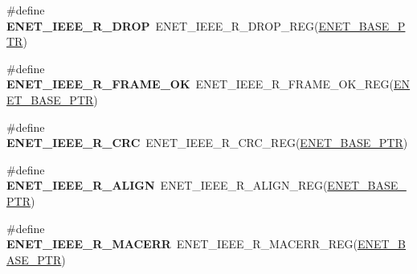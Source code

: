 \begin{DoxyCompactItemize}
\item 
\hypertarget{group___e_n_e_t___register___accessor___macros_gaccf89cd15d247486412191b1af3f77c3}{}\#define {\bfseries E\+N\+E\+T\+\_\+\+I\+E\+E\+E\+\_\+\+R\+\_\+\+D\+R\+O\+P}~E\+N\+E\+T\+\_\+\+I\+E\+E\+E\+\_\+\+R\+\_\+\+D\+R\+O\+P\+\_\+\+R\+E\+G(\hyperlink{group___e_n_e_t___peripheral_gab64a2d991cc2bd76dd55ee25a52dcb5c}{E\+N\+E\+T\+\_\+\+B\+A\+S\+E\+\_\+\+P\+T\+R})\label{group___e_n_e_t___register___accessor___macros_gaccf89cd15d247486412191b1af3f77c3}

\item 
\hypertarget{group___e_n_e_t___register___accessor___macros_ga8dec0614e17f4be2b36f2ed6c68695ef}{}\#define {\bfseries E\+N\+E\+T\+\_\+\+I\+E\+E\+E\+\_\+\+R\+\_\+\+F\+R\+A\+M\+E\+\_\+\+O\+K}~E\+N\+E\+T\+\_\+\+I\+E\+E\+E\+\_\+\+R\+\_\+\+F\+R\+A\+M\+E\+\_\+\+O\+K\+\_\+\+R\+E\+G(\hyperlink{group___e_n_e_t___peripheral_gab64a2d991cc2bd76dd55ee25a52dcb5c}{E\+N\+E\+T\+\_\+\+B\+A\+S\+E\+\_\+\+P\+T\+R})\label{group___e_n_e_t___register___accessor___macros_ga8dec0614e17f4be2b36f2ed6c68695ef}

\item 
\hypertarget{group___e_n_e_t___register___accessor___macros_ga517e6963ed94b067d5820f77694f9fb5}{}\#define {\bfseries E\+N\+E\+T\+\_\+\+I\+E\+E\+E\+\_\+\+R\+\_\+\+C\+R\+C}~E\+N\+E\+T\+\_\+\+I\+E\+E\+E\+\_\+\+R\+\_\+\+C\+R\+C\+\_\+\+R\+E\+G(\hyperlink{group___e_n_e_t___peripheral_gab64a2d991cc2bd76dd55ee25a52dcb5c}{E\+N\+E\+T\+\_\+\+B\+A\+S\+E\+\_\+\+P\+T\+R})\label{group___e_n_e_t___register___accessor___macros_ga517e6963ed94b067d5820f77694f9fb5}

\item 
\hypertarget{group___e_n_e_t___register___accessor___macros_ga3deebba7193f28275cb1598150dc3c91}{}\#define {\bfseries E\+N\+E\+T\+\_\+\+I\+E\+E\+E\+\_\+\+R\+\_\+\+A\+L\+I\+G\+N}~E\+N\+E\+T\+\_\+\+I\+E\+E\+E\+\_\+\+R\+\_\+\+A\+L\+I\+G\+N\+\_\+\+R\+E\+G(\hyperlink{group___e_n_e_t___peripheral_gab64a2d991cc2bd76dd55ee25a52dcb5c}{E\+N\+E\+T\+\_\+\+B\+A\+S\+E\+\_\+\+P\+T\+R})\label{group___e_n_e_t___register___accessor___macros_ga3deebba7193f28275cb1598150dc3c91}

\item 
\hypertarget{group___e_n_e_t___register___accessor___macros_ga4d4f33d57b7f466b4ce6d2ebb575fc9f}{}\#define {\bfseries E\+N\+E\+T\+\_\+\+I\+E\+E\+E\+\_\+\+R\+\_\+\+M\+A\+C\+E\+R\+R}~E\+N\+E\+T\+\_\+\+I\+E\+E\+E\+\_\+\+R\+\_\+\+M\+A\+C\+E\+R\+R\+\_\+\+R\+E\+G(\hyperlink{group___e_n_e_t___peripheral_gab64a2d991cc2bd76dd55ee25a52dcb5c}{E\+N\+E\+T\+\_\+\+B\+A\+S\+E\+\_\+\+P\+T\+R})\label{group___e_n_e_t___register___accessor___macros_ga4d4f33d57b7f466b4ce6d2ebb575fc9f}


\end{DoxyCompactItemize}
